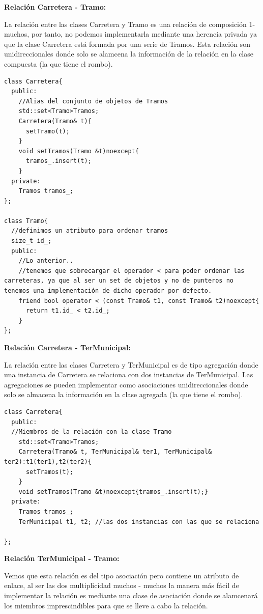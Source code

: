 \textbf{Relación Carretera - Tramo:}

La relación entre las clases Carretera y Tramo es una relación de composición 1-muchos, por tanto, no podemos implementarla mediante una herencia privada ya que la clase Carretera está formada por una serie de Tramos.
Esta relación son unidireccionales donde solo se alamcena la información de la relación en la clase compuesta (la que tiene el rombo).

\begin{verbatim}
class Carretera{
  public:
    //Alias del conjunto de objetos de Tramos
    std::set<Tramo>Tramos;
    Carretera(Tramo& t){
      setTramo(t);
    }
    void setTramos(Tramo &t)noexcept{
      tramos_.insert(t);
    }
  private:
    Tramos tramos_;
};

class Tramo{
  //definimos un atributo para ordenar tramos
  size_t id_;
  public:
    //Lo anterior..
    //tenemos que sobrecargar el operador < para poder ordenar las carreteras, ya que al ser un set de objetos y no de punteros no tenemos una implementación de dicho operador por defecto.
    friend bool operator < (const Tramo& t1, const Tramo& t2)noexcept{
      return t1.id_ < t2.id_;
    }
};
\end{verbatim}
\newpage
\textbf{Relación Carretera - TerMunicipal:}

La relación entre las clases Carretera y TerMunicipal es de tipo agregación donde una instancia de Carretera se relaciona con dos instancias de TerMunicipal.
Las agregaciones se pueden implementar como asociaciones unidireccionales donde solo se almacena la información en la clase agregada (la que tiene el rombo).

\begin{verbatim}
class Carretera{
  public:
  //Miembros de la relación con la clase Tramo
    std::set<Tramo>Tramos;
    Carretera(Tramo& t, TerMunicipal& ter1, TerMunicipal& ter2):t1(ter1),t2(ter2){
      setTramos(t);
    }
    void setTramos(Tramo &t)noexcept{tramos_.insert(t);}
  private:
    Tramos tramos_;
    TerMunicipal t1, t2; //las dos instancias con las que se relaciona

};
\end{verbatim}

\textbf{Relación TerMunicipal - Tramo:}

Vemos que esta relación es del tipo asociación pero contiene un atributo de enlace, al ser las dos multiplicidad muchos - muchos la manera más fácil de implementar la relación es mediante una clase de asociación donde se alamcenará los miembros imprescindibles para que se lleve a cabo la relación.

